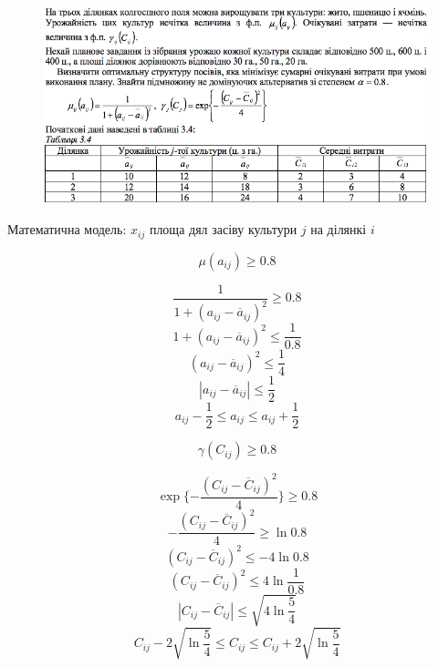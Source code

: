 \begin{center}
  \normalsize{}
\end{center}

\begin{figure}[h!]
  \centering
  \includegraphics[width=14.8cm]{3_4.png}
  \centering
\end{figure}

Математична модель: $x_{ij}$ площа дял засіву культури $j$ на ділянкі $i$

\begin{multicols}{2}
  $$\mu(a_{ij}) \geqslant 0.8  $$

  $$ \dfrac{1}{1+(a_{ij}-\overline{a}_{ij})^2} \geqslant 0.8 $$
  $$ 1+(a_{ij}-\overline{a}_{ij})^2 \leqslant \dfrac{1}{0.8}   $$
  $$ (a_{ij}-\overline{a}_{ij})^2 \leqslant \dfrac{1}{4} $$
  $$ |a_{ij}-\overline{a}_{ij}| \leqslant \dfrac{1}{2} $$
  $$ a_{ij} - \dfrac{1}{2} \leqslant a_{ij} \leqslant a_{ij} + \dfrac{1}{2}  $$

  \columnbreak
  $$\gamma(C_{ij}) \geqslant 0.8 $$

  $$ \exp\{ - \dfrac{(C_{ij}-\overline{C}_{ij})^2}{4} \} \geqslant 0.8 $$
  $$ -\dfrac{(C_{ij}-\overline{C}_{ij})^2}{4} \geqslant \ln{0.8} $$
  $$ (C_{ij}-\overline{C}_{ij})^2 \leqslant -4 \ln{0.8} $$
  $$ (C_{ij}-\overline{C}_{ij})^2 \leqslant 4 \ln{\dfrac{1}{0.8}} $$
  $$ |C_{ij}-\overline{C}_{ij}| \leqslant  \sqrt{4 \ln{\dfrac{5}{4}}} $$
  $$ C_{ij} - 2 \sqrt{\ln{\dfrac{5}{4}}} \leqslant C_{ij} \leqslant C_{ij} + 2 \sqrt{ \ln{\dfrac{5}{4}}}$$

\end{multicols}


